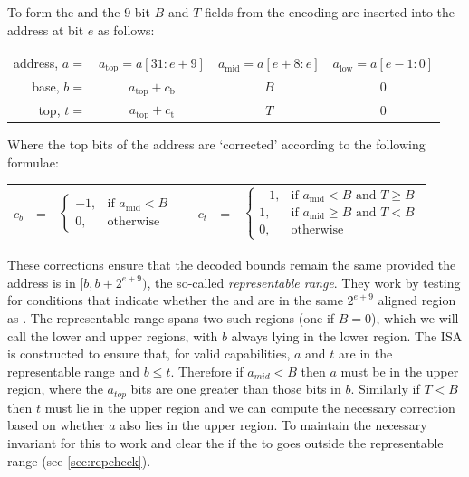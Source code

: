 To form the \cbase{} and \ctop{} the 9-bit $B$ and $T$ fields from the encoding are inserted into the address at bit $e$ as follows:

\begin{center}
{
\renewcommand{\arraystretch}{1.5}
\begin{tabular}{r|c|c|c|}
\cline{2-4}
address, $a =$ & $a_\text{top} = a[31:e+9]$ & $a_\text{mid} = a[e+8:e]$  & $a_\text{low} = a[e-1:0]$ \\ \cline{2-4}
base, $b =$    & $a_\text{top}+c_\text{b}$   & $B $ & $0$ \\ \cline{2-4}
top, $t =$     & $a_\text{top}+c_\text{t}$   & $T $ & $0$ \\ \cline{2-4}
\end{tabular}
}
\end{center}

Where the top bits of the address are `corrected' according to the following formulae:

\begin{center}
\begin{tabular}{r c l p{1em} r c l}
$c_b$ & = & $\begin{cases}
-1, & \text{if } a_\text{mid} < B \\
0,  & \text{otherwise}
\end{cases}$ 
&&
$c_t$ & = & $\begin{cases}
  -1, & \text{if } a_\text{mid} < B \text{ and } T \ge B \\
  1,  & \text{if } a_\text{mid} \ge B \text{ and } T < B \\
  0,  & \text{otherwise}
\end{cases}$
\end{tabular}
\end{center}

These corrections ensure that the decoded bounds remain the same provided the address is in $[b, b + 2^{e+9})$, the so-called \emph{representable range}.
They work by testing for conditions that indicate whether the \ctop{} and \caddress{} are in the same $2^{e+9}$ aligned region as \cbase{}.
The representable range spans two such regions (one if $B = 0$), which we will call the lower and upper regions, with $b$ always lying in the lower region.
The ISA is constructed to ensure that, for valid capabilities, $a$ and $t$ are in the representable range and $b \le t$.
Therefore if $a_{mid} \lt B$ then $a$ must be in the upper region, where the $a_{top}$ bits are one greater than those bits in $b$.
Similarly if $T \lt B$ then $t$ must lie in the upper region and we can compute the necessary correction based on whether $a$ also lies in the upper region.
To maintain the necessary invariant for this to work  and  clear the \ctag{} if the \caddress{} to goes outside the representable range (see \cref{sec:repcheck}).

